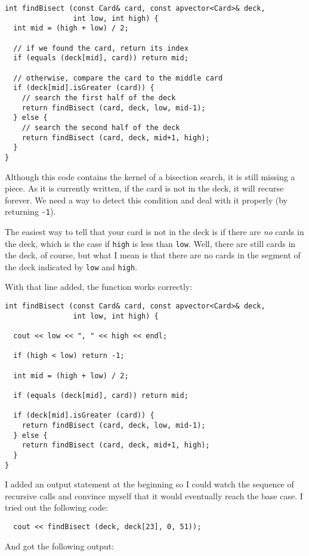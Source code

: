 \begin{verbatim}
int findBisect (const Card& card, const apvector<Card>& deck,
                int low, int high) {
  int mid = (high + low) / 2;

  // if we found the card, return its index
  if (equals (deck[mid], card)) return mid;

  // otherwise, compare the card to the middle card
  if (deck[mid].isGreater (card)) {
    // search the first half of the deck
    return findBisect (card, deck, low, mid-1);
  } else {
    // search the second half of the deck
    return findBisect (card, deck, mid+1, high);
  }
}
\end{verbatim}
%
Although this code contains the kernel of a bisection search, it
is still missing a piece.  As it is currently written,
if the card is not in the deck, it will recurse forever.  We
need a way to detect this condition and deal with it properly
(by returning {\tt -1}).


The easiest way to tell that your card is not in the deck
is if there are {\em no} cards in the deck, which is the
case if {\tt high} is less than {\tt low}.  Well, there are
still cards in the deck, of course, but what I mean is that
there are no cards in the segment of the deck indicated by
{\tt low} and {\tt high}.

With that line added, the function works correctly:

\begin{verbatim}
int findBisect (const Card& card, const apvector<Card>& deck,
                int low, int high) {

  cout << low << ", " << high << endl;

  if (high < low) return -1;

  int mid = (high + low) / 2;

  if (equals (deck[mid], card)) return mid;

  if (deck[mid].isGreater (card)) {
    return findBisect (card, deck, low, mid-1);
  } else {
    return findBisect (card, deck, mid+1, high);
  }
}
\end{verbatim}
%
I added an output statement at the beginning so I could watch
the sequence of recursive calls and convince myself
that it would eventually reach the base case.  I tried out the
following code:

\begin{verbatim}
  cout << findBisect (deck, deck[23], 0, 51));
\end{verbatim}
%
And got the following output:

